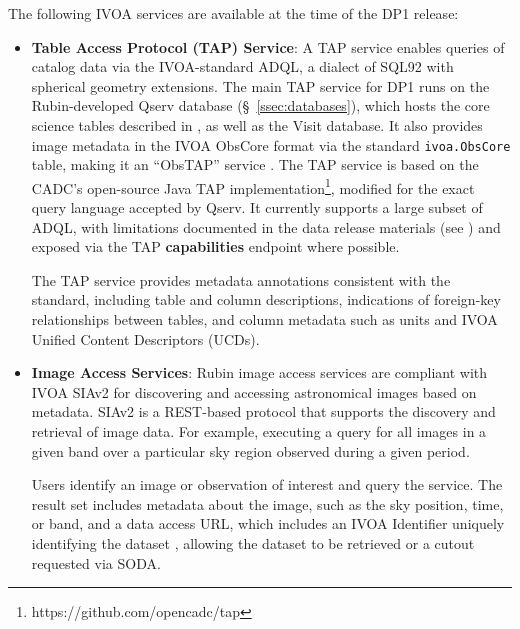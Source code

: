 The following \gls{IVOA} services are available at the time of the DP1 release:
\begin{itemize}
\vspace{0.1cm}
\item \textbf{Table Access Protocol (TAP) Service}: A TAP service \citep{2019ivoa.spec.0927D} enables queries of catalog data via the IVOA-standard \gls{ADQL}, a dialect of SQL92 with spherical geometry extensions.
The main \gls{TAP} service for \gls{DP1} runs on the Rubin-developed \gls{Qserv} database (\S~\ref{ssec:databases}), which hosts the core science tables described in , as well as the Visit database.
It also provides image metadata in the IVOA ObsCore format via the standard \texttt{ivoa.ObsCore} table, making it an ``ObsTAP'' service \citep[ObsTAP;][]{2017ivoa.spec.0509L}.
The TAP service is based on the \gls{CADC}'s open-source Java TAP implementation\footnote{https://github.com/opencadc/tap}, modified for the exact query language accepted by Qserv.
It currently supports a large subset of ADQL, with limitations documented in the data release materials (see ) and exposed via the TAP \textbf{capabilities} endpoint where possible. \

The TAP service provides metadata annotations consistent with the standard, including table and column descriptions, indications of foreign-key relationships between tables, and column metadata such as units and \gls{IVOA} Unified Content Descriptors (UCDs).

\vspace{0.1cm}
\item \textbf{Image Access Services}: Rubin image access services are compliant with \gls{IVOA} SIAv2 \citep[Simple Image Access Protocol, version 2;][]{2025arXiv250100544J,2015ivoa.spec.1223D}
for discovering and accessing astronomical images based on \gls{metadata}.
SIAv2 is a \gls{REST}-based protocol that supports the discovery and retrieval of image data.
For example, executing a query for all images in a given band over a particular sky region observed during a given period.

Users identify an image or observation of interest and query the service.
The result set includes \gls{metadata} about the image, such as the sky position, time, or band, and a data access URL, which includes an IVOA Identifier uniquely identifying the dataset \citep{DMTN-302}, allowing the dataset to be retrieved or a cutout requested via \gls{SODA}.


\end{itemize}

